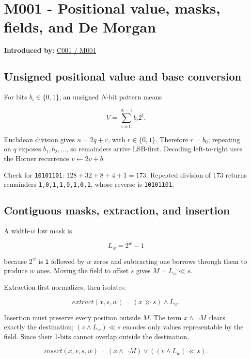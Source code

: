 \section{M001 - Positional value, masks, fields, and De Morgan}\label{01-foundations-i-ch011-m001---positional-value-masks-fields-and-de-morgan}

\textbf{Introduced by:} \hyperref[01-foundations-i-ch001-from-a-signal-to-an-interpretation]{C001 / M001}

\subsection{Unsigned positional value and base conversion}\label{01-foundations-i-ch011-unsigned-positional-value-and-base-conversion}

For bits \(b_i\in\{0,1\}\), an unsigned \(N\)-bit pattern means

\[
V=\sum_{i=0}^{N-1}b_i2^i.
\]

Euclidean division gives \(n=2q+r\), with \(r\in\{0,1\}\). Therefore \(r=b_0\); repeating on \(q\) exposes \(b_1,b_2,\ldots\), so remainders arrive LSB-first. Decoding left-to-right uses the Horner recurrence \(v\leftarrow2v+b\).

Check for \texttt{10101101}: \(128+32+8+4+1=173\). Repeated division of 173 returns remainders \texttt{1,0,1,1,0,1,0,1}, whose reverse is \texttt{10101101}.

\subsection{Contiguous masks, extraction, and insertion}\label{01-foundations-i-ch011-contiguous-masks-extraction-and-insertion}

A width-\(w\) low mask is

\[
L_w=2^w-1
\]

because \(2^w\) is \texttt{1} followed by \(w\) zeros and subtracting one borrows through them to produce \(w\) ones. Moving the field to offset \(s\) gives \(M=L_w\ll s\).

Extraction first normalizes, then isolates:

\[
extract(x,s,w)=(x\gg s)\land L_w.
\]

Insertion must preserve every position outside \(M\). The term \(x\land\neg M\) clears exactly the destination; \((v\land L_w)\ll s\) encodes only values representable by the field. Since their 1-bits cannot overlap outside the destination,

\[
insert(x,v,s,w)=(x\land\neg M)\lor((v\land L_w)\ll s).
\]

